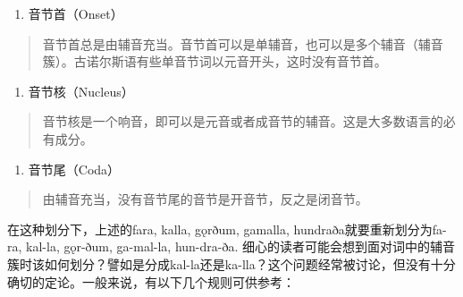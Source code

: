 \begin{enumerate}
\def\labelenumi{\arabic{enumi}.}
\item
  音节首（Onset）
\end{enumerate}

\begin{quote}
音节首总是由辅音充当。音节首可以是单辅音，也可以是多个辅音（辅音簇）。古诺尔斯语有些单音节词以元音开头，这时没有音节首。
\end{quote}

\begin{enumerate}
\def\labelenumi{\arabic{enumi}.}
\setcounter{enumi}{1}
\item
  音节核（Nucleus）
\end{enumerate}

\begin{quote}
音节核是一个响音，即可以是元音或者成音节的辅音。这是大多数语言的必有成分。
\end{quote}

\begin{enumerate}
\def\labelenumi{\arabic{enumi}.}
\setcounter{enumi}{2}
\item
  音节尾（Coda）
\end{enumerate}

\begin{quote}
由辅音充当，没有音节尾的音节是开音节，反之是闭音节。
\end{quote}

在这种划分下，上述的fara, kalla, gǫrðum, gamalla,
hundraða就要重新划分为fa-ra, kal-la, gǫr-ðum, ga-mal-la, hun-dra-ða.
细心的读者可能会想到面对词中的辅音簇时该如何划分？譬如是分成kal-la还是ka-lla？这个问题经常被讨论，但没有十分确切的定论。一般来说，有以下几个规则可供参考：

